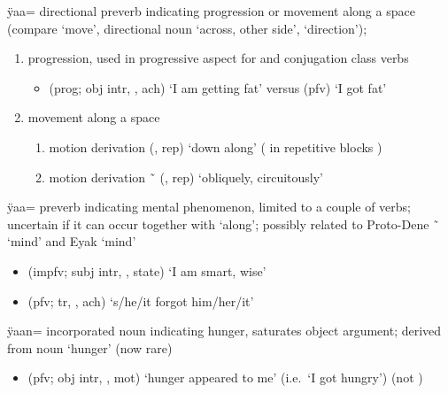 \begin{morphdesc}[resume*=alphalist]
\item[ÿaa=]
	directional preverb indicating progression or movement along a space
	(compare  ‘move’,
		directional noun  ‘across, other side’,
		 ‘direction’);
	\begin{enumerate}
	\item	progression, used in progressive aspect for  and  conjugation class verbs
		\begin{itemize}
		\item	{} (prog; obj intr, , ach) ‘I am getting fat’\newline
			versus  (pfv) ‘I got fat’
		\end{itemize}
	\item	movement along a space
		\begin{enumerate}
		\item	motion derivation
				 (,  rep) ‘down along’
				( in repetitive blocks )
		\item	motion derivation
				 \~\  (,  rep) ‘obliquely, circuitously’
		\end{enumerate}
	\end{enumerate}

\item[ÿaa=]
	preverb indicating mental phenomenon, limited to a couple of verbs;
	uncertain if it can occur together with  ‘along’;
	possibly related to Proto-Dene  \~\  ‘mind’ and Eyak  ‘mind’
	\begin{itemize}
	\item	{} (impfv; subj intr, ,  state) ‘I am smart, wise’
	\item	{} (pfv; tr, , ach) ‘s/he/it forgot him/her/it’
	\end{itemize}

\item[ÿaan=]
	incorporated noun indicating hunger,
	saturates object argument;
	derived from noun  ‘hunger’ (now rare)
	\begin{itemize}
	\item	{} (pfv; obj intr, , mot) ‘hunger appeared to me’ (i.e.\ ‘I got hungry’)\newline
		(not )
	\end{itemize}


\end{morphdesc}
